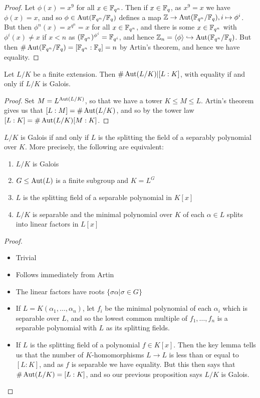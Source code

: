 \documentclass[10pt,a4paper]{article}
\begin{document}
\begin{proof}
Let $\phi(x) = x^9$ for all $x \in \mathbb{F}_{q^n}$. Then if $x \in \mathbb{F}_q$, as $x^9 = x$ we have $\phi(x) = x$, and so $\phi \in \operatorname{Aut}(\mathbb{F}_{q^n}/\mathbb{F}_q)$ defines a map $\mathbb{Z} \to \operatorname{Aut}(\mathbb{F}_{q^n}/\mathbb{F}_q), i \mapsto \phi^i$. But then $\phi^n(x) = x^{q^n} = x$ for all $x \in \mathbb{F}_{q^n}$, and there is some $x \in \mathbb{F}_{q^n}$ with $\phi^i(x) \neq x$ if $x < n$ as $(\mathbb{F}_{q^n})^{\phi^i} = \mathbb{F}_{q^i}$, and hence $\mathbb{Z}_n = \langle \phi \rangle \hookrightarrow \operatorname{Aut}(\mathbb{F}_{q^n}/\mathbb{F}_q)$. But then $\#\operatorname{Aut}(\mathbb{F}_{q^n}/\mathbb{F}_q) = [\mathbb{F}_{q^n} : \mathbb{F}_q] = n$ by Artin's theorem, and hence we have equality.
\end{proof}

\begin{proposition}
Let $L/K$ be a finite extension. Then $\#\operatorname{Aut}(L/K) | [L:K]$, with equality if and only if $L/K$ is Galois.
\end{proposition}
\begin{proof}
Set $M = L^{\operatorname{Aut}(L/K)}$, so that we have a tower $K \leq M \leq L$. Artin's theorem gives us that $[L:M] = \#\operatorname{Aut}(L/K)$, and so by the tower law $[L:K] = \#\operatorname{Aut}(L/K)[M:K]$.
\end{proof}
\begin{theorem}
$L/K$ is Galois if and only if $L$ is the splitting the field of a separably polynomial over $K$. More precisely, the following are equivalent:
\begin{enumerate}
\item $L/K$ is Galois
\item $G \leq \operatorname{Aut}(L)$ is a finite subgroup and $K = L^G$
\item $L$ is the splitting field of a separable polynomial in $K[x]$
\item $L/K$ is separable and the minimal polynomial over $K$ of each $\alpha \in L$ splits into linear factors in $L[x]$
\end{enumerate}
\end{theorem}
\begin{proof}\item
\begin{itemize}
\item[\imp{1}{2}] Trivial
\item[\imp{2}{1}] Follows immediately from Artin
\item[\imp{2}{4}] The linear factors have roots $\{\sigma\alpha | \sigma \in G\}$
\item[\imp{4}{3}] If $L=K(\alpha_1, \ldots, \alpha_n)$, let $f_i$ be the minimal polynomial of each $\alpha_i$ which is separable over $L$, and so the lowest common multiple of $f_1, \ldots, f_n$ is a separable polynomial with $L$ as its splitting fields.
\item[\imp{3}{1}] If $L$ is the splitting field of a polynomial $f \in K[x]$. Then the key lemma tells us that the number of $K$-homomorphisms $L \to L$ is less than or equal to $[L:K]$, and as $f$ is separable we have equality. But this then says that $\#\operatorname{Aut}(L/K)=[L:K]$, and so our previous proposition says $L/K$ is Galois.
\end{itemize}
\end{proof}
\end{document}
